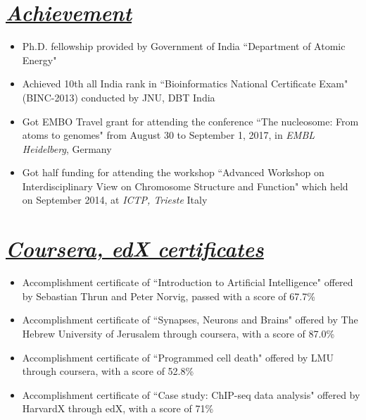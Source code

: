\documentclass{res}
\begin{document}
\begin{resume}
\begin{itemize}
\section{\sl  \underline{Achievement}}
\begin{itemize}
\item Ph.D. fellowship provided by Government of India ``Department of Atomic Energy" 
\item Achieved 10th all India rank in ``Bioinformatics National Certificate Exam" (BINC-2013) conducted by JNU, DBT India 
\item Got EMBO Travel grant for attending the conference ``The nucleosome: From atoms to genomes" from August 30 to September 1, 2017, in {\it EMBL Heidelberg}, Germany
\item Got half funding for attending the workshop ``Advanced Workshop on Interdisciplinary View on Chromosome Structure and Function" which held on September 2014, at {\it ICTP, Trieste} Italy   
\end{itemize}
 
\section{\sl  \underline{Coursera, edX certificates}}
\begin{itemize}
\item Accomplishment certificate of ``Introduction to Artificial Intelligence" offered by Sebastian Thrun and Peter Norvig, passed with a score of 67.7\% 
\item Accomplishment certificate of ``Synapses, Neurons and Brains" offered by The Hebrew University of Jerusalem through coursera, with a score of 87.0\% 
\item Accomplishment certificate of ``Programmed cell death" offered by LMU through coursera, with a score of 52.8\% 
\item Accomplishment certificate of ``Case study: ChIP-seq data analysis" offered by HarvardX through edX, with a score of 71\%  
\end{itemize}




\end{itemize}




\end{resume}
\end{document}
